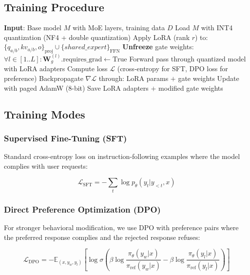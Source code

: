 \documentclass[11pt,a4paper]{article}
\begin{document}
\subsection{Training Procedure}

\begin{algorithm}
\caption{Gate-Targeted QLoRA (GT-QLoRA)}
\begin{algorithmic}[1]
\State \textbf{Input}: Base model $M$ with MoE layers, training data $D$
\State Load $M$ with INT4 quantization (NF4 + double quantization)
\State Apply LoRA (rank $r$) to: $\{q_{a/b}, kv_{a/b}, o\}_{\text{proj}} \cup \{shared\_expert\}_{\text{FFN}}$
\State \textbf{Unfreeze} gate weights: $\forall l \in [1..L]: \mathbf{W}_g^{(l)}.\text{requires\_grad} \leftarrow \text{True}$
    \State Forward pass through quantized model with LoRA adapters
    \State Compute loss $\mathcal{L}$ (cross-entropy for SFT, DPO loss for preference)
    \State Backpropagate $\nabla\mathcal{L}$ through: LoRA params $+$ gate weights
    \State Update with paged AdamW (8-bit)
\EndFor
\State Save LoRA adapters $+$ modified gate weights
\end{algorithmic}
\end{algorithm}

\subsection{Training Modes}

\subsubsection{Supervised Fine-Tuning (SFT)}

Standard cross-entropy loss on instruction-following examples where the model complies with user requests:

$$\mathcal{L}_{\text{SFT}} = -\sum_{t} \log p_\theta(y_t | y_{<t}, x)$$

\subsubsection{Direct Preference Optimization (DPO)}

For stronger behavioral modification, we use DPO \citep{rafailov2023direct} with preference pairs where the preferred response complies and the rejected response refuses:

$$\mathcal{L}_{\text{DPO}} = -\mathbb{E}_{(x, y_w, y_l)} \left[ \log \sigma \left( \beta \log \frac{\pi_\theta(y_w|x)}{\pi_{\text{ref}}(y_w|x)} - \beta \log \frac{\pi_\theta(y_l|x)}{\pi_{\text{ref}}(y_l|x)} \right) \right]$$
\end{document}
